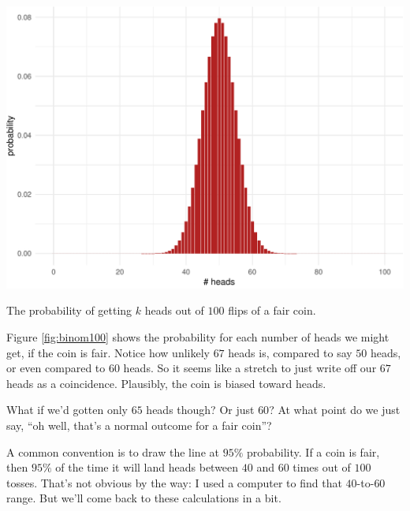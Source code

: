 \documentclass[justified]{tufte-book}
\theoremstyle{definition}
\theoremstyle{definition}
\theoremstyle{definition}
\theoremstyle{definition}
\theoremstyle{remark}
\begin{document}
\begin{marginfigure}
\includegraphics{_main_files/figure-latex/binom100-1} \caption[The probability of getting $k$ heads out of $100$ flips of a fair coin]{The probability of getting $k$ heads out of $100$ flips of a fair coin.}\label{fig:binom100}
\end{marginfigure}

Figure \ref{fig:binom100} shows the probability for each number of heads we might get, if the coin is fair. Notice how unlikely \(67\) heads is, compared to say \(50\) heads, or even compared to \(60\) heads. So it seems like a stretch to just write off our \(67\) heads as a coincidence. Plausibly, the coin is biased toward heads.

What if we'd gotten only \(65\) heads though? Or just \(60\)? At what point do we just say, ``oh well, that's a normal outcome for a fair coin''?

A common convention is to draw the line at \(95\%\) probability. If a coin is fair, then \(95\%\) of the time it will land heads between \(40\) and \(60\) times out of \(100\) tosses. That's not obvious by the way: I used a computer to find that \(40\)-to-\(60\) range. But we'll come back to these calculations in a bit.
\end{document}
